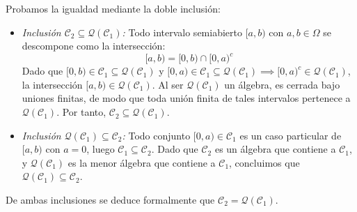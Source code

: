 \begin{problema}
\begin{enumerate}[label=\alph*)]
    Probamos la igualdad mediante la doble inclusión:
    \begin{itemize}
        \item \textit{Inclusión $\mathcal{C}_2 \subseteq \mathcal{Q}(\mathcal{C}_1)$:} Todo intervalo semiabierto $[a,b)$ con $a,b \in \Omega$ se descompone como la intersección:
        \[
            [a,b) = [0,b) \cap [0,a)^c
        \]
        Dado que $[0,b) \in \mathcal{C}_1 \subseteq \mathcal{Q}(\mathcal{C}_1)$ y $[0,a) \in \mathcal{C}_1 \subseteq \mathcal{Q}(\mathcal{C}_1) \implies [0,a)^c \in \mathcal{Q}(\mathcal{C}_1)$, la intersección $[a,b) \in \mathcal{Q}(\mathcal{C}_1)$. Al ser $\mathcal{Q}(\mathcal{C}_1)$ un álgebra, es cerrada bajo uniones finitas, de modo que toda unión finita de tales intervalos pertenece a $\mathcal{Q}(\mathcal{C}_1)$. Por tanto, $\mathcal{C}_2 \subseteq \mathcal{Q}(\mathcal{C}_1)$.

        \item \textit{Inclusión $\mathcal{Q}(\mathcal{C}_1) \subseteq \mathcal{C}_2$:} Todo conjunto $[0,a) \in \mathcal{C}_1$ es un caso particular de $[a,b)$ con $a=0$, luego $\mathcal{C}_1 \subseteq \mathcal{C}_2$. Dado que $\mathcal{C}_2$ es un álgebra que contiene a $\mathcal{C}_1$, y $\mathcal{Q}(\mathcal{C}_1)$ es la menor álgebra que contiene a $\mathcal{C}_1$, concluimos que $\mathcal{Q}(\mathcal{C}_1) \subseteq \mathcal{C}_2$.
    \end{itemize}
    De ambas inclusiones se deduce formalmente que $\mathcal{C}_2 = \mathcal{Q}(\mathcal{C}_1)$.
\end{enumerate}
\end{problema}
\newpage
